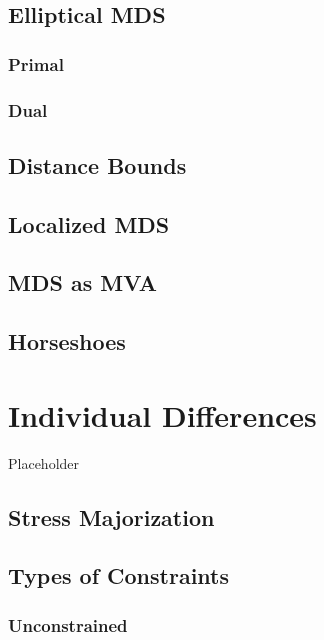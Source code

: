 \documentclass[
  12pt,
]{book}
\begin{document}
\section{Elliptical MDS}\label{ellimcds}

\subsection{Primal}\label{elliprimal}

\subsection{Dual}\label{ellidual}

\section{Distance Bounds}\label{distance-bounds}

\section{Localized MDS}\label{localized-mds}

\section{MDS as MVA}\label{mds-as-mva}

\section{Horseshoes}\label{conshorseshoes}

\chapter{Individual Differences}\label{chindif}

Placeholder

\section{Stress Majorization}\label{stress-majorization}

\section{Types of Constraints}\label{types-of-constraints}

\subsection{Unconstrained}\label{indifunc}
\end{document}
